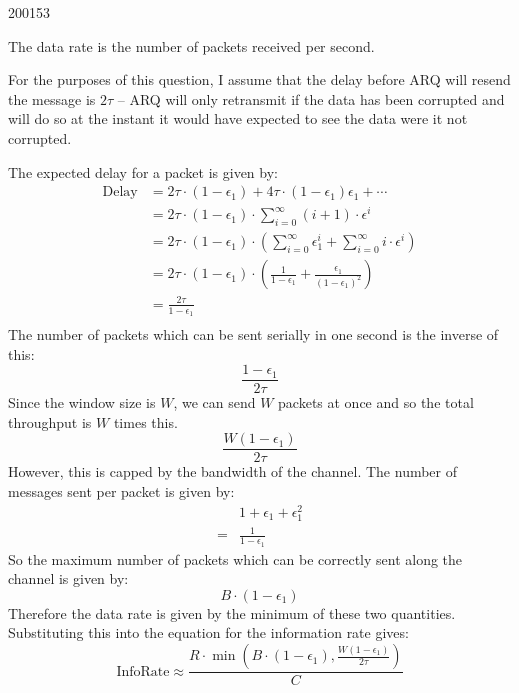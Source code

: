 \documentclass[10pt,\jkfside,a4paper]{article}
\begin{document}
\begin{examquestion}{2001}{5}{3}
\begin{enumerate}
The data rate is the number of packets received per second.

For the purposes of this question, I assume that the delay before ARQ will
resend the message is $2\tau$ -- ARQ will only retransmit if the data has
been corrupted and will do so at the instant it would have expected to see
the data were it not corrupted.

The expected delay for a packet is given by:
\begin{align*}
\text{Delay} &= 2\tau \cdot (1 - \epsilon_1) + 4\tau \cdot (1 - \epsilon_1)
\epsilon_1 + \cdots \\
&= 2\tau \cdot (1 - \epsilon_1) \cdot \sum^{\infty}_{i=0} (i+1) \cdot
\epsilon^i \\
&= 2\tau \cdot (1 - \epsilon_1) \cdot \left(
\sum^{\infty}_{i=0} \epsilon_1^i +
\sum^{\infty}_{i=0} i \cdot
\epsilon^i \right) \\
&= 2\tau \cdot (1 - \epsilon_1) \cdot \left( \frac{1}{1 - \epsilon_1} + \frac{
\epsilon_1}{(1 - \epsilon_1)^2} \right) \\
&= \frac{2\tau}{1 - \epsilon_1} \\
\end{align*}
The number of packets which can be sent serially in one second is the
inverse of this:
\[
\frac{1 - \epsilon_1}{2\tau}
\]
Since the window size is $W$, we can send $W$ packets at once and so the
total throughput is $W$ times this.
\[
\frac{W(1 - \epsilon_1)}{2\tau}
\]
However, this is capped by the bandwidth of the channel. The number of
messages sent per packet is given by:
\begin{align*}
 & 1 + \epsilon_1 + \epsilon_1^2 \\
=& \frac{1}{1 - \epsilon_1}
\end{align*}
So the maximum number of packets which can be correctly sent along the
channel is given by:
\[
B\cdot(1 - \epsilon_1)
\]
Therefore the data rate is given by the minimum of these two quantities.
Substituting this into the equation for the information rate gives:
\[
\text{InfoRate} \approx \frac{R \cdot \min\left( B\cdot(1 - \epsilon_1),
\frac{W(1 - \epsilon_1)}{2\tau}\right)}{C}
\]

\end{enumerate}

\end{examquestion}
\end{document}
